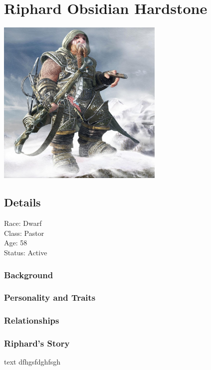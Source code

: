 \section{Riphard Obsidian Hardstone}

\begin{center}
\includegraphics[width=80mm]{./content/img/riphard1.jpg}
\begin{figure}[h]
\end{figure}
\end{center}

\subsection*{Details} 

\noindent

Race: 	Dwarf \\
Class: 	Pastor \\
Age: 	58 \\
Status: Active 

\subsubsection{Background}


\subsubsection{Personality and Traits}



\subsubsection{Relationships}



\subsubsection{Riphard's Story}



\begin{DndSidebar}{text}
 dfhgsfdghfsgh
\end{DndSidebar}

\smallskip

\bigskip


\clearpage